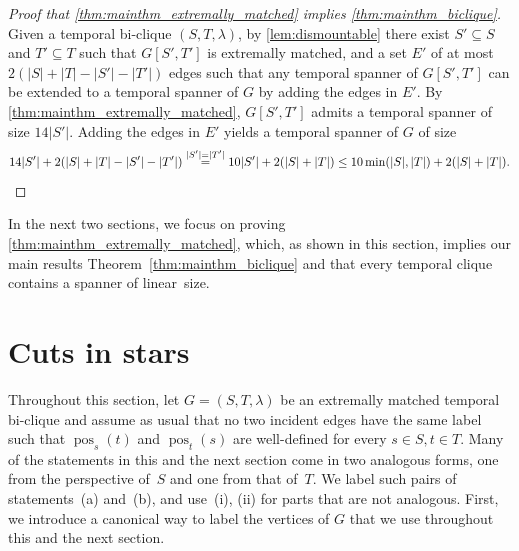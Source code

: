 \documentclass[11pt, letterpaper]{article}
\DeclareMathOperator{\pos}{pos}
\theoremstyle{definition}
\theoremstyle{plain}
\begin{document}
\begin{proof}[Proof that \cref{thm:mainthm_extremally_matched} implies \cref{thm:mainthm_biclique}]
Given a temporal bi-clique $(S,T,\lambda)$, by \cref{lem:dismountable} there exist $S'\subseteq S$ and $T'\subseteq T$ such that $G[S',T']$ is extremally matched, and a set $E'$ of at most $2(|S|+|T|-|S'|-|T'|)$ edges such that any temporal spanner of $G[S',T']$ can be extended to a temporal spanner of $G$ by adding the edges in $E'$.
By \cref{thm:mainthm_extremally_matched}, $G[S',T']$ admits a temporal spanner of size $14|S'|$. 
Adding the edges in $E'$ yields a temporal spanner of $G$ of size
\begin{equation*}
  14|S'| + 2(|S|+|T|-|S'|-|T'|)
  \overset{|S'|=|T'|}= 10|S'| + 2(|S|+|T|)
  \leq 10\min(|S|,|T|) + 2(|S|+|T|).\qedhere
\end{equation*}
\end{proof}

In the next two sections, we focus on proving \cref{thm:mainthm_extremally_matched}, which, as shown in this section, implies our
main results Theorem~\ref{thm:mainthm_biclique} and that every temporal clique contains a spanner of linear~size.






\section{Cuts in stars}
\label{sec:cuts_in_stars}

Throughout this section, let $G=(S,T,\lambda)$ be an extremally matched temporal bi-clique and assume as usual that no two incident edges have the same label such that $\pos_s(t)$ and $\pos_t(s)$ are well-defined for every $s\in S, t\in T$.
Many of the statements in this and the next section come in two analogous forms, one from the perspective of~$S$ and one from that of~$T$. 
We label such pairs of statements~(a) and~(b), and use~(i), (ii) for parts that are not analogous.
First, we introduce a canonical way to label the vertices of $G$ that we use throughout this and the next section.
\end{document}
